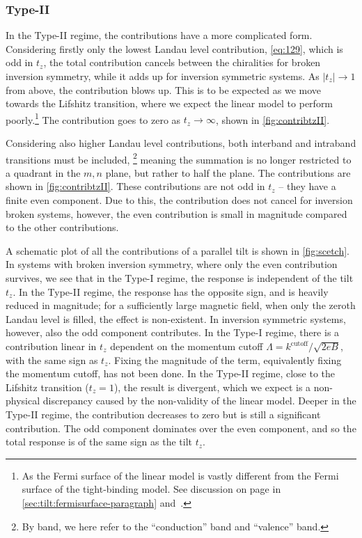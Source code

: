 \subsubsection{Type-II}
In the Type-II regime, the contributions have a more complicated form.
Considering firstly only the lowest Landau level contribution, \cref{eq:129}, which is odd in \( t_z \), the total contribution cancels between the chiralities for broken inversion symmetry, while it adds up for inversion symmetric systems.
As \( |t_z| \to 1 \) from above, the contribution blows up.
This is to be expected as we move towards the Lifshitz transition, where we expect the linear model to perform poorly.\footnote{As the Fermi surface of the linear model is vastly different from the Fermi surface of the tight-binding model.
See discussion on page \pageref{sec:tilt:fermisurface-paragraph} in \cref{sec:tilt:fermisurface-paragraph} and~\textcite{vanderwurffMagnetovorticalThermoelectricTransport2019}.}
The contribution goes to zero as \( t_z \to \infty \), shown in \cref{fig:contribtzII}.

Considering also higher Landau level contributions, both interband and intraband transitions must be included,%
\footnote{By band, we here refer to the ``conduction'' band and ``valence'' band.}
meaning the summation is no longer restricted to a quadrant in the \( m,n \) plane, but rather to half the plane.
The contributions are shown in \cref{fig:contribtzII}.
These contributions are not odd in \( t_z \) -- they have a finite even component.
Due to this, the contribution does not cancel for inversion broken systems, however, the even contribution is small in magnitude compared to the other contributions.

A schematic plot of all the contributions of a parallel tilt is shown in \cref{fig:scetch}.
In systems with broken inversion symmetry, where only the even contribution survives, we see that in the Type-I regime, the response is independent of the tilt \( t_z \).
In the Type-II regime, the response has the opposite sign, and is heavily reduced in magnitude;
for a sufficiently large magnetic field, when only the zeroth Landau level is filled, the effect is non-existent.
In inversion symmetric systems, however, also the odd component contributes.
In the Type-I regime, there is a contribution linear in \( t_z \) dependent on the momentum cutoff \( \Lambda = k^{\text{cutoff}} /\sqrt{2 eB}   \), with the same sign as \( t_z \).
Fixing the magnitude of the term, equivalently fixing the momentum cutoff, has not been done.
In the Type-II regime, close to the Lifshitz transition (\( t_z = 1 \)), the result is divergent, which we expect is a non-physical discrepancy caused by the non-validity of the linear model.
Deeper in the Type-II regime, the contribution decreases to zero but is still a significant contribution.
The odd component dominates over the even component, and so the total response is of the same sign as the tilt \( t_z \).

